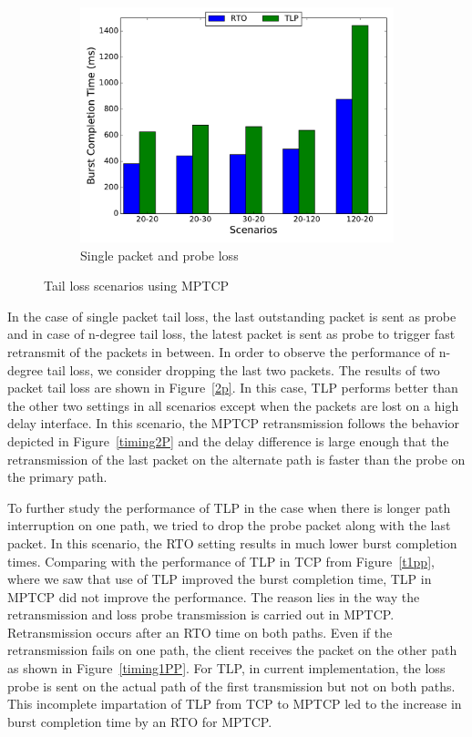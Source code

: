\documentclass[10pt,conference,compsoc]{IEEEtran}
\begin{document}
\begin{figure}[!tbp]
\begin{subfigure}[b]{0.32\textwidth}
\includegraphics[angle=0, width=\textwidth, natwidth=578.16,natheight=433.62]{plots/1PP.pdf}
\caption{Single packet and probe loss}\label{1pp}
 \end{subfigure}
 \caption{Tail loss scenarios using MPTCP}
\end{figure}





In the case of single packet tail loss, the last outstanding packet is sent as probe and in case of n-degree tail loss,
the latest packet is sent as probe to trigger fast retransmit of the packets in between. In order to observe
the performance of n-degree tail loss, we consider dropping the last two packets. 
The results of two packet tail loss are shown in Figure~\ref{2p}. In this case, TLP performs better than the other 
two settings in all scenarios except when the packets are lost on a high delay interface. In this scenario, the MPTCP retransmission follows the 
behavior depicted in Figure~\ref{timing2P} and the delay difference is large enough that the retransmission of the last packet on the alternate path is 
faster than the probe on the primary path. 


To further study the performance of TLP in the case when there is longer path interruption on one path, we tried to drop the probe packet along with the last packet. In this scenario, the RTO
setting results in much lower burst completion times. Comparing with the performance of TLP in TCP from Figure~\ref{t1pp}, where we saw that use of TLP improved the burst completion time, TLP in MPTCP did not improve the performance. The reason lies in the way the retransmission and loss probe transmission is carried out in MPTCP. Retransmission occurs after an RTO time on both paths.
Even if the retransmission fails on one path, the client receives the packet on the other path as shown in Figure~\ref{timing1PP}. For TLP, in
current implementation, the loss probe is sent on the actual path of the first transmission but not on both paths. This incomplete impartation of
TLP from TCP to MPTCP led to the increase in burst completion time by an RTO for MPTCP. 
\end{document}
